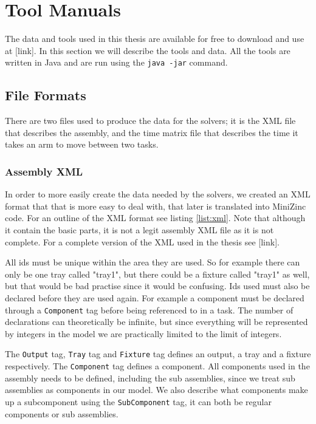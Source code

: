 \chapter{Tool Manuals}\label{app:tool_manuals}
The data and tools used in this thesis are available for free to download and use at [link]. In this section we will describe the tools and data. All the tools are written in Java and are run using the \texttt{java -jar} command.

\section{File Formats}
There are two files used to produce the data for the solvers; it is the XML file that describes the assembly, and the time matrix file that describes the time it takes an arm to move between two tasks.
\subsection{Assembly XML}\label{sec:xml}
In order to more easily create the data needed by the solvers, we created an XML format that that is more easy to deal with, that later is translated into MiniZinc code. For an outline of the XML format see listing \ref{list:xml}. Note that although it contain the basic parts, it is not a legit assembly XML file as it is not complete. For a complete version of the XML used in the thesis see [link].

All ids must be unique within the area they are used. So for example there can only be one tray called "tray1", but there could be a fixture called "tray1" as well, but that would be bad practise since it would be confusing. Ids used must also be declared before they are used again. For example a component must be declared through a \texttt{Component} tag before being referenced to in a task. The number of declarations can theoretically be infinite, but since everything will be represented by integers in the model we are practically limited to the limit of integers.

The \texttt{Output} tag, \texttt{Tray} tag and \texttt{Fixture} tag defines an output, a tray and a fixture respectively. The \texttt{Component} tag defines a component. All components used in the assembly needs to be defined, including the sub assemblies, since we treat sub assemblies as components in our model. We also describe what components make up a subcomponent using the \texttt{SubComponent} tag, it can both be regular components or sub assemblies.

